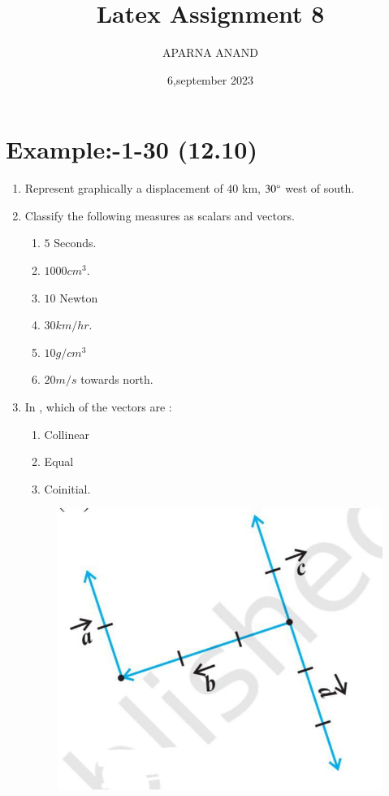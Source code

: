 \documentclass{article}
\theoremstyle{remark}
\begin{document}
\title{Latex Assignment 8}                            \author{APARNA ANAND}
\date{6,september 2023}
\maketitle
\section*{Example:-1-30 (12.10)}
\begin{enumerate}
\item Represent graphically a displacement of $40$ km, $30\degree$ west of south.
\item Classify the following measures as scalars and vectors.
\begin{enumerate}
\item $5$ Seconds.
\item $1000 cm^3$.
\item $10$ Newton
\item $30 km/hr$.
\item $10 g/cm^3$
\item $20 m/s$ towards north.
\end{enumerate}
\item In , which of the vectors are :
\begin{enumerate}
\item Collinear
\item Equal
\item Coinitial.
\end{enumerate}
\begin{figure}[ht]
\centering
\includegraphics[width=\columnwidth]{figs/10.5.png}

\end{figure}
\end{enumerate}
\end{document}
